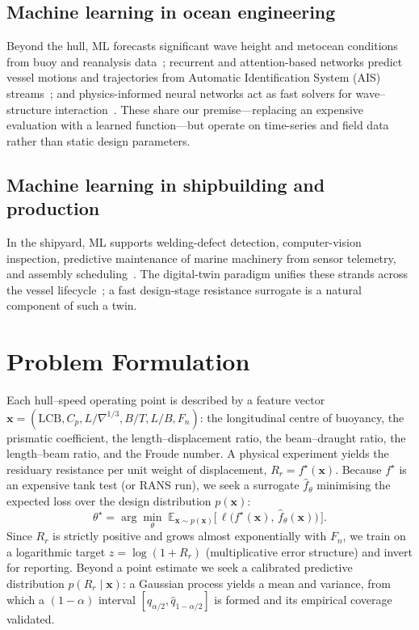 \documentclass[conference]{IEEEtran}
\begin{document}
\subsection{Machine learning in ocean engineering}
Beyond the hull, ML forecasts significant wave height and metocean conditions
from buoy and reanalysis data~\cite{james2018}; recurrent and attention-based
networks predict vessel motions and trajectories from Automatic Identification
System (AIS) streams~\cite{murray2021}; and physics-informed neural networks act
as fast solvers for wave--structure interaction~\cite{raissi2019}. These share
our premise---replacing an expensive evaluation with a learned function---but
operate on time-series and field data rather than static design parameters.

\subsection{Machine learning in shipbuilding and production}
In the shipyard, ML supports welding-defect detection, computer-vision
inspection, predictive maintenance of marine machinery from sensor telemetry,
and assembly scheduling~\cite{lee2021,kong2022}. The digital-twin paradigm
unifies these strands across the vessel lifecycle~\cite{major2021}; a fast
design-stage resistance surrogate is a natural component of such a twin.

\section{Problem Formulation}
\label{sec:problem}

Each hull--speed operating point is described by a feature vector
$\mathbf{x}=(\mathrm{LCB},C_p,L/\nabla^{1/3},B/T,L/B,F_n)$: the longitudinal
centre of buoyancy, the prismatic coefficient, the length--displacement ratio,
the beam--draught ratio, the length--beam ratio, and the Froude number. A
physical experiment yields the residuary resistance per unit weight of
displacement, $R_r=f^{\star}(\mathbf{x})$. Because $f^{\star}$ is an expensive
tank test (or RANS run), we seek a surrogate $\hat{f}_{\theta}$ minimising the
expected loss over the design distribution $p(\mathbf{x})$:
\begin{equation}
\theta^{\star}=\arg\min_{\theta}\;
\mathbb{E}_{\mathbf{x}\sim p(\mathbf{x})}
\big[\,\ell\big(f^{\star}(\mathbf{x}),\,\hat{f}_{\theta}(\mathbf{x})\big)\,\big].
\label{eq:erm}
\end{equation}
Since $R_r$ is strictly positive and grows almost exponentially with $F_n$, we
train on a logarithmic target $z=\log(1+R_r)$ (multiplicative error structure)
and invert for reporting. Beyond a point estimate we seek a calibrated
predictive distribution $p(R_r\mid\mathbf{x})$: a Gaussian process yields a mean
and variance, from which a $(1-\alpha)$ interval $[\hat{q}_{\alpha/2},
\hat{q}_{1-\alpha/2}]$ is formed and its empirical coverage validated.
\end{document}
